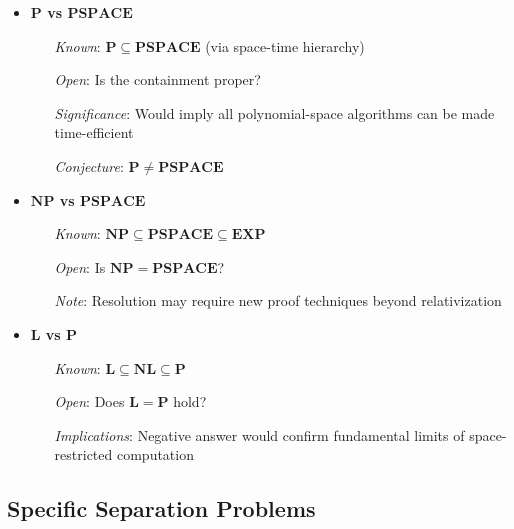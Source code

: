 \begin{itemize}
    \item \textbf{$\mathbf{P}$ vs $\mathbf{PSPACE}$}
    \begin{itemize}
        \item[\textit{Known}:] $\mathbf{P} \subseteq \mathbf{PSPACE}$ (via space-time hierarchy)
        \item[\textit{Open}:] Is the containment proper?
        \item[\textit{Significance}:] Would imply all polynomial-space algorithms can be made time-efficient
        \item[\textit{Conjecture}:] $\mathbf{P} \neq \mathbf{PSPACE}$
    \end{itemize}

    \item \textbf{$\mathbf{NP}$ vs $\mathbf{PSPACE}$}
    \begin{itemize}
        \item[\textit{Known}:] $\mathbf{NP} \subseteq \mathbf{PSPACE} \subseteq \mathbf{EXP}$
        \item[\textit{Open}:] Is $\mathbf{NP} = \mathbf{PSPACE}$?
        \item[\textit{Note}:] Resolution may require new proof techniques beyond relativization
    \end{itemize}

    \item \textbf{$\mathbf{L}$ vs $\mathbf{P}$}
    \begin{itemize}
        \item[\textit{Known}:] $\mathbf{L} \subseteq \mathbf{NL} \subseteq \mathbf{P}$
        \item[\textit{Open}:] Does $\mathbf{L} = \mathbf{P}$ hold?
        \item[\textit{Implications}:] Negative answer would confirm fundamental limits of space-restricted computation
    \end{itemize}
\end{itemize}

\subsection{Specific Separation Problems}

